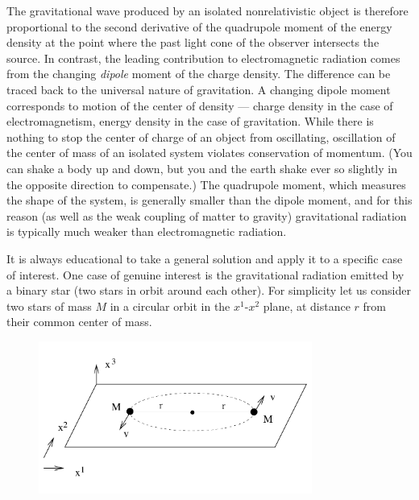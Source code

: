 \documentclass[12pt]{article}
\begin{document}
The gravitational wave produced by an isolated nonrelativistic object
is therefore proportional to the second derivative of the quadrupole
moment of the energy density at the point where the past light cone 
of the observer intersects the source.  In contrast, the leading
contribution to electromagnetic radiation comes from the changing
{\it dipole} moment of the charge density.  The difference can be
traced back to the universal nature of gravitation.  A changing dipole
moment corresponds to motion of the center of density --- charge density
in the case of electromagnetism, energy density in the case of 
gravitation.  While there is nothing to stop the center of charge of an 
object from oscillating, oscillation of the center of mass of an isolated
system violates conservation of momentum.  (You can shake a body up and
down, but you and the earth shake ever so slightly in the opposite
direction to compensate.)  The quadrupole moment, which
measures the shape of the system, is generally smaller than the dipole
moment, and for this reason (as well as the weak coupling of matter
to gravity) gravitational radiation is typically much weaker than
electromagnetic radiation.

It is always educational to take a general solution and apply it to
a specific case of interest.  One case of genuine interest is the
gravitational radiation emitted by a binary star (two stars in orbit
around each other).  For simplicity let us consider two stars of mass
$M$ in a circular orbit in the $x^1$-$x^2$ plane, at distance $r$ from 
their common center of mass.

\begin{figure}[h]
  \centerline{
  \includegraphics[height=5cm]{pdf/six8}}
\end{figure}
\end{document}
